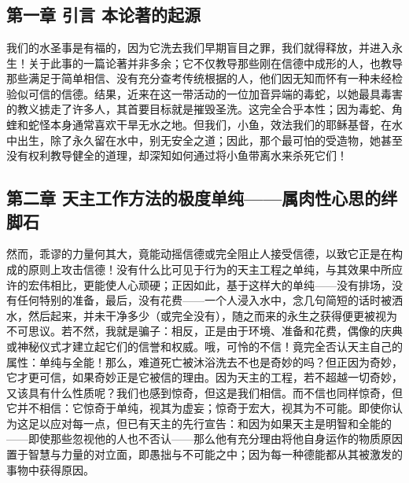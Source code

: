 
\chapter{}



\section{第一章 引言 本论著的起源}

我们的水圣事是有福的，因为它洗去我们早期盲目之罪，我们就得释放，并进入永生！关于此事的一篇论著并非多余；它不仅教导那些刚在信德中成形的人，也教导那些满足于简单相信、没有充分查考传统根据的人，他们因无知而怀有一种未经检验似可信的信德。结果，近来在这一带活动的一位加音异端的毒蛇，以她最具毒害的教义掳走了许多人，其首要目标就是摧毁圣洗。这完全合乎本性；因为毒蛇、角蝰和蛇怪本身通常喜欢干旱无水之地。但我们，小鱼，效法我们的耶稣基督，在水中出生，除了永久留在水中，别无安全之道；因此，那个最可怕的受造物，她甚至没有权利教导健全的道理，却深知如何通过将小鱼带离水来杀死它们！\par


\section{第二章 天主工作方法的极度单纯——属肉性心思的绊脚石}

然而，乖谬的力量何其大，竟能动摇信德或完全阻止人接受信德，以致它正是在构成的原则上攻击信德！没有什么比可见于行为的天主工程之单纯，与其效果中所应许的宏伟相比，更能使人心顽硬；正因如此，基于这样大的单纯——没有排场，没有任何特别的准备，最后，没有花费——一个人浸入水中，念几句简短的话时被洒水，然后起来，并未干净多少（或完全没有），随之而来的永生之获得便更被视为不可思议。若不然，我就是骗子：相反，正是由于环境、准备和花费，偶像的庆典或神秘仪式才建立起它们的信誉和权威。哦，可怜的不信！竟完全否认天主自己的属性：单纯与全能！那么，难道死亡被沐浴洗去不也是奇妙的吗？但正因为奇妙，它才更可信，如果奇妙正是它被信的理由。因为天主的工程，若不超越一切奇妙，又该具有什么性质呢？我们也感到惊奇，但这是我们相信。而不信也同样惊奇，但它并不相信：它惊奇于单纯，视其为虚妄；惊奇于宏大，视其为不可能。即使你认为这足以应对每一点，但已有天主的先行宣告：和因为如果天主是明智和全能的——即使那些忽视他的人也不否认——那么他有充分理由将他自身运作的物质原因置于智慧与力量的对立面，即愚拙与不可能之中；因为每一种德能都从其被激发的事物中获得原因。\par

